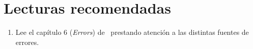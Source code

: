 \section{Lecturas recomendadas}

\begin{enumerate}

\item Lee el capítulo 6 (\emph{Errors}) de~\cite{stroustrup:2014} prestando
      atención a las distintas fuentes de errores.

\end{enumerate}
